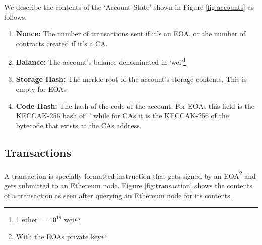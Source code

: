 We describe the contents of the `Account State' shown in Figure \ref{fig:accounts} as follows:
\begin{enumerate}
    \item \textbf{Nonce:} The number of transactions sent if it's an EOA, or the number of contracts created if it's a CA.
    \item \textbf{Balance:} The account's balance denominated in `wei'\footnote{1 ether $= 10^{18}$ wei }
    \item \textbf{Storage Hash:} The merkle root of the account's storage contents. This is empty for EOAs
    \item \textbf{Code Hash:} The hash of the code of the account. For EOAs this field is the KECCAK-256 hash of `' while for CAs it is the KECCAK-256 of the bytecode that exists at the CAs address.
\end{enumerate}

\subsection{Transactions} \label{transactions}
A transaction is specially formatted instruction that gets signed by an EOA\footnote{With the EOAs private key} and gets submitted to an Ethereum node. Figure \ref{fig:transaction} shows the contents of a transaction as seen after querying an Ethereum node for its contents.


